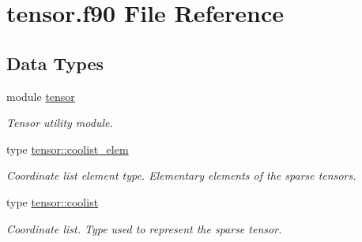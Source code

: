 \hypertarget{tensor_8f90}{\section{tensor.\-f90 File Reference}
\label{tensor_8f90}
}
\subsection*{Data Types}
\begin{DoxyCompactItemize}
\item 
module \hyperlink{classtensor}{tensor}
\begin{DoxyCompactList}\small\item\em Tensor utility module. \end{DoxyCompactList}\item 
type \hyperlink{structtensor_1_1coolist__elem}{tensor\-::coolist\-\_\-elem}
\begin{DoxyCompactList}\small\item\em Coordinate list element type. Elementary elements of the sparse tensors. \end{DoxyCompactList}\item 
type \hyperlink{structtensor_1_1coolist}{tensor\-::coolist}
\begin{DoxyCompactList}\small\item\em Coordinate list. Type used to represent the sparse tensor. \end{DoxyCompactList}\end{DoxyCompactItemize}
